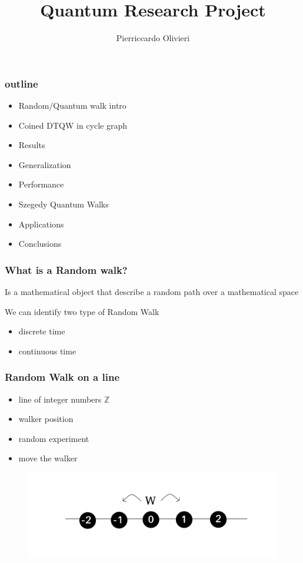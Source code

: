 \documentclass{beamer}
\title{Quantum Research Project}
\author{Pierriccardo Olivieri}
\institute{Politecnico di Milano}
\begin{document}
\maketitle


\begin{frame}
    \frametitle{outline}
    \begin{itemize}
        \item Random/Quantum walk intro
        \item Coined DTQW in cycle graph 
        \item Results
        \item Generalization
        \item Performance
        \item Szegedy Quantum Walks
        \item Applications 
        \item Conclusions
    \end{itemize}
\end{frame}

\begin{frame}
    \frametitle{What is a Random walk?}
    \begin{definition}
        Is a mathematical object that describe a random path over a mathematical space 
    \end{definition}
    We can identify two type of Random Walk
    \begin{itemize}
        \item discrete time 
        \item continuous time 
    \end{itemize}
    
\end{frame}

\begin{frame}
    \frametitle{Random Walk on a line}
    \begin{example}
        \begin{itemize}
            \item line of integer numbers $\mathbb{Z}$
            \item walker position
            \item random experiment
            \item move the walker
        \end{itemize}
    \end{example}

    \begin{figure}[h!]
        \includegraphics[scale=0.3]{img/random_walk_line.png}
        \centering
    \end{figure}
\end{frame}
\end{document}
